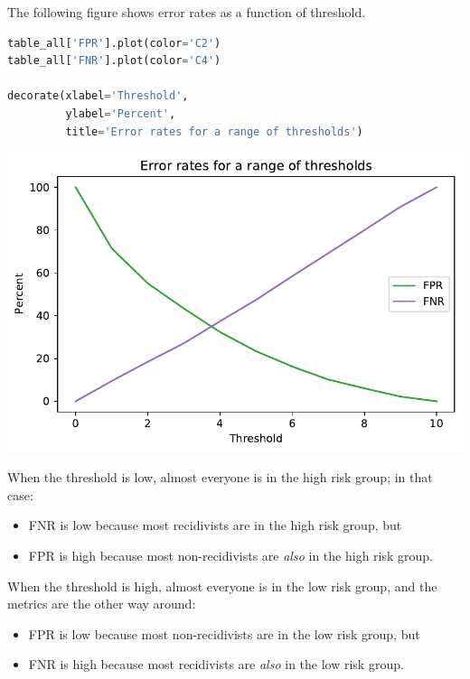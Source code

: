 The following figure shows error rates as a function of threshold.

\begin{lstlisting}[language=Python]
table_all['FPR'].plot(color='C2')
table_all['FNR'].plot(color='C4')

decorate(xlabel='Threshold', 
         ylabel='Percent',
         title='Error rates for a range of thresholds')
\end{lstlisting}

\begin{center}
\includegraphics[scale=0.75]{chapters/02_calibration_files/02_calibration_37_0.pdf}
\end{center}

When the threshold is low, almost everyone is in the high risk group; in
that case:

\begin{itemize}
\item
  FNR is low because most recidivists are in the high risk group, but
\item
  FPR is high because most non-recidivists are \emph{also} in the high
  risk group.
\end{itemize}

When the threshold is high, almost everyone is in the low risk group,
and the metrics are the other way around:

\begin{itemize}
\item
  FPR is low because most non-recidivists are in the low risk group, but
\item
  FNR is high because most recidivists are \emph{also} in the low risk
  group.
\end{itemize}

